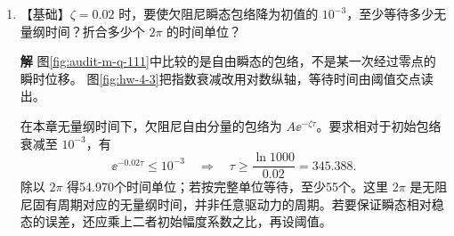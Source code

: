 \documentclass[11pt,openany,fontset=fandol]{ctexbook}
\theoremstyle{plain}\newtheorem{theorem}{定理}[chapter]\newtheorem{proposition}[theorem]{命题}
\theoremstyle{definition}\newtheorem{definition}{定义}[chapter]\newtheorem{example}{例}[chapter]
\theoremstyle{remark}\newtheorem*{remark}{说明}
\newcommand{\SolutionStart}{\par\nobreak\medskip\nobreak\noindent\textbf{解}\quad\ignorespaces}
\newenvironment{solution}{\SolutionStart}{\par\medskip}
\newcommand{\vct}[1]{\bm{#1}}\newcommand{\Rea}{\operatorname{Re}}\newcommand{\Ima}{\operatorname{Im}}
\begin{document}
\begin{enumerate}[label=4.\arabic*,itemsep=3pt]
\begin{minipage}[t]{\linewidth}
\end{minipage}

\begin{solution}
图\ref{fig:audit-m-q-110}中$\theta_0$决定周期修正；累计相位误差还取决于观察时间。
图\ref{fig:ex-4-2}以竖直向下为摆角零点，释放点的 $\theta_0$ 决定周期修正。

小角周期为 $T_0=2\pi\sqrt{\ell/g}=2.00709\,\mathrm s$。用单摆周期的二阶展开，
\[
T/T_0\simeq1+\theta_0^2/16=1.0025,\qquad
T\simeq2.01211\,\mathrm s.
\]
在 $t=100T_0$ 时，小角解的相位已走过 $200\pi$，实际相位约为 $2\pi t/T$，所以落后量为
\[
\Delta\varphi\simeq200\pi\left(1-\frac1{1.0025}\right)
\simeq1.567\,\mathrm{rad}.
\]
若同样只保留振幅二阶，$\Delta\varphi\simeq200\pi\theta_0^2/16=\pi/2$。周期的相对误差约0.25\%，每一周期只差很少；相位记录了累计走过的周期数，误差会随观察时间增长。这里的数值仍是二阶近似估计，不能作为长时间精确单摆轨迹。

\begin{figure}[H]\centering
{}
\caption{题4.2、4.5：从角度 $\theta_0$ 静止释放的无阻尼单摆。}\label{fig:ex-4-2}
\end{figure}

图中完整往返一次才是一个周期；微小的单次周期差重复100次后，才累积成题目所问的相位落后。
\end{solution}

\item \begin{minipage}[t]{\linewidth}
【基础】$\zeta=0.02$ 时，要使欠阻尼瞬态包络降为初值的 $10^{-3}$，至少等待多少无量纲时间？折合多少个 $2\pi$ 的时间单位？
\end{minipage}

\begin{solution}
图\ref{fig:audit-m-q-111}中比较的是自由瞬态的包络，不是某一次经过零点的瞬时位移。
图\ref{fig:hw-4-3}把指数衰减改用对数纵轴，等待时间由阈值交点读出。

在本章无量纲时间下，欠阻尼自由分量的包络为 $A\ee^{-\zeta\tau}$。要求相对于初始包络衰减至 $10^{-3}$，有
\[
\ee^{-0.02\tau}\le10^{-3}
\quad\Longrightarrow\quad
\tau\ge\frac{\ln1000}{0.02}=345.388.
\]
除以 $2\pi$ 得54.970个时间单位；若按完整单位等待，至少55个。这里 $2\pi$ 是无阻尼固有周期对应的无量纲时间，并非任意驱动力的周期。若要保证瞬态相对稳态的误差，还应乘上二者初始幅度系数之比，再设阈值。


\end{solution}
\end{enumerate}
\end{document}
